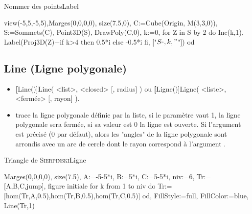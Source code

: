 \begin{demo}{Nommer des points}{Label}
\begin{texgraph}[name=Label,
       preload="PolyedresII.mac"]
view(-5,5,-5,5),Marges(0,0,0,0), size(7.5,0),
C:=Cube(Origin, M(3,3,0)), S:=Sommets(C), 
Point3D(S), DrawPoly(C,0), k:=0,
for Z in S by 2 do
 Inc(k,1),
 Label(Proj3D(Z)+if k>4 then 0.5*i else -0.5*i fi,
   ["$S_",k,"$"])
od 
\end{texgraph}
\end{demo}

\subsection{Line (Ligne polygonale)}\label{cmdLigne}
\begin{itemize}
 \item \util \textbf[Line()]{Line( <list>, <closed> [, radius] )} ou \textbf[Ligne()]{Ligne( <liste>, <fermée> [, rayon] )}.
 \item \desc trace la ligne polygonale définie par la liste, si le paramètre  vaut 1, la ligne polygonale sera fermée, si sa valeur est 0 la ligne est ouverte. Si l'argument  est précisé (0 par défaut), alors les "angles" de la ligne polygonale sont arrondis avec un arc de cercle dont le rayon correspond à l'argument .
\end{itemize}

\begin{demo}{Triangle de \textsc{Sierpinski}}{Ligne}
\begin{texgraph}[name=Ligne]
Marges(0,0,0,0), size(7.5),
A:=-5-5*i, B:=5*i, C:=5-5*i, niv:=6,
Tr:=[A,B,C,jump], {figure initiale}
for k from 1 to niv do
 Tr:=[hom(Tr,A,0.5),hom(Tr,B,0.5),hom(Tr,C,0.5)]
od,
FillStyle:=full, FillColor:=blue, Line(Tr,1) 
\end{texgraph}
\end{demo}

